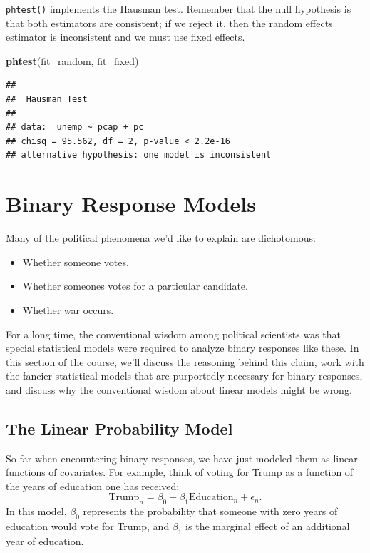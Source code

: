 \documentclass[12pt,oneside,openany]{book}
\newenvironment{Shaded}{\begin{snugshade}}{\end{snugshade}}
\newcommand{\KeywordTok}[1]{\textcolor[rgb]{0.13,0.29,0.53}{\textbf{#1}}}
\newcommand{\NormalTok}[1]{#1}
\begin{document}
\texttt{phtest()} implements the Hausman test. Remember that the null
hypothesis is that both estimators are consistent; if we reject it, then
the random effects estimator is inconsistent and we must use fixed
effects.

\begin{Shaded}
\begin{Highlighting}[]
\KeywordTok{phtest}\NormalTok{(fit_random, fit_fixed)}
\end{Highlighting}
\end{Shaded}

\begin{verbatim}
## 
##  Hausman Test
## 
## data:  unemp ~ pcap + pc
## chisq = 95.562, df = 2, p-value < 2.2e-16
## alternative hypothesis: one model is inconsistent
\end{verbatim}

\chapter{Binary Response Models}\label{logit}

Many of the political phenomena we'd like to explain are dichotomous:

\begin{itemize}
\item
  Whether someone votes.
\item
  Whether someones votes for a particular candidate.
\item
  Whether war occurs.
\end{itemize}

For a long time, the conventional wisdom among political scientists was
that special statistical models were required to analyze binary
responses like these. In this section of the course, we'll discuss the
reasoning behind this claim, work with the fancier statistical models
that are purportedly necessary for binary responses, and discuss why the
conventional wisdom about linear models might be wrong.

\section{The Linear Probability
Model}\label{the-linear-probability-model}

So far when encountering binary responses, we have just modeled them as
linear functions of covariates. For example, think of voting for Trump
as a function of the years of education one has received: \[
\text{Trump}_n = \beta_0 + \beta_1 \text{Education}_n + \epsilon_n.
\] In this model, \(\beta_0\) represents the probability that someone
with zero years of education would vote for Trump, and \(\beta_1\) is
the marginal effect of an additional year of education.
\end{document}
